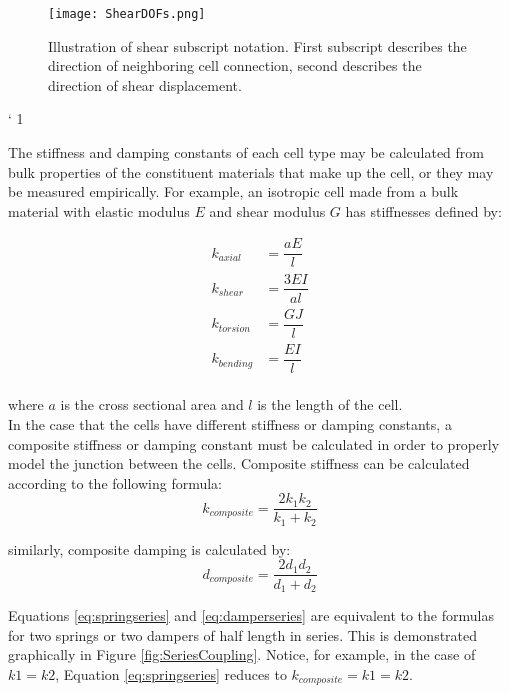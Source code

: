 {\begin{figure}
  \texttt{[image: ShearDOFs.png]}
  \caption{Illustration of shear subscript notation.  First subscript describes the direction of neighboring cell connection, second describes the direction of shear displacement.}
  \label{fig:ShearDOFs}
\end{figure}`	1

The stiffness and damping constants of each cell type may be calculated from bulk properties of the constituent materials that make up the cell, or they may be measured empirically.  For example, an isotropic cell made from a bulk material with elastic modulus $E$ and shear modulus $G$ has stiffnesses defined by:

\begin{subequations}
\begin{align} 
\label{eq:kaxial}
k_{axial} &= \dfrac{aE}{l}\\[10pt]
\label{eq:kshear}
k_{shear} &= \dfrac{3EI}{al}\\[10pt]
\label{eq:ktorsion}
k_{torsion} &= \dfrac{GJ}{l}\\[10pt]
\label{eq:kbending}
k_{bending} &= \dfrac{EI}{l}
\end{align}
\end{subequations}
\\
where $a$ is the cross sectional area and $l$ is the length of the cell.\\

 In the case that the cells have different stiffness or damping constants, a composite stiffness or damping constant must be calculated in order to properly model the junction between the cells.  Composite stiffness can be calculated according to the following formula:
 \begin{equation} \label{eq:springseries}
 k_{composite} = \dfrac{2k_1k_2}{k_1+k_2}
 \end{equation}

similarly, composite damping is calculated by:
 \begin{equation} \label{eq:damperseries}
d_{composite} = \dfrac{2d_1d_2}{d_1+d_2}
 \end{equation}
 
 Equations \ref{eq:springseries} and \ref{eq:damperseries} are equivalent to the formulas for two springs or two dampers of half length in series.  This is demonstrated graphically in Figure \ref{fig:SeriesCoupling}.  Notice, for example, in the case of $k1=k2$, Equation \ref{eq:springseries} reduces to $ k_{composite} = k1 = k2$.\\
 
}
